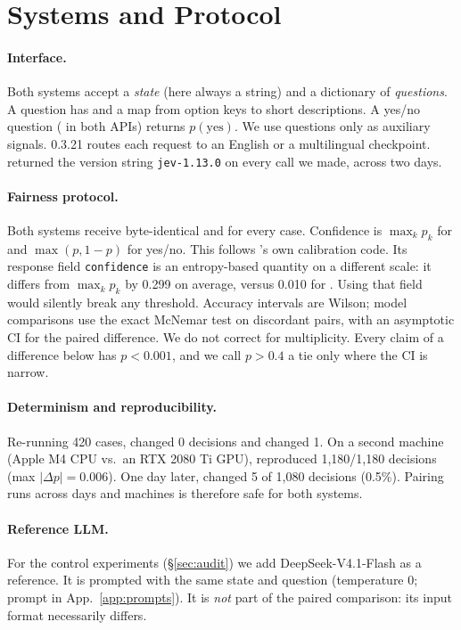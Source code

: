 \section{Systems and Protocol}\label{sec:setup}
\paragraph{Interface.}
Both systems accept a \emph{state} (here always a string) and a dictionary of \emph{questions}. A  question has  and a  map from option keys to short descriptions. A yes/no question ( in both APIs) returns $p(\text{yes})$. We use  questions only as auxiliary signals. \laya{} 0.3.21 routes each request to an English or a multilingual checkpoint. \jev{} returned the version string \texttt{jev-1.13.0} on every call we made, across two days.

\paragraph{Fairness protocol.}
Both systems receive byte-identical  and  for every case. Confidence is $\max_k p_k$ for  and $\max(p,1-p)$ for yes/no. This follows \laya{}'s own calibration code. Its response field \texttt{confidence} is an entropy-based quantity on a different scale: it differs from $\max_k p_k$ by 0.299 on average, versus 0.010 for \jev{}. Using that field would silently break any threshold. Accuracy intervals are Wilson; model comparisons use the exact McNemar test on discordant pairs, with an asymptotic CI for the paired difference. We do not correct for multiplicity. Every claim of a difference below has $p<0.001$, and we call $p>0.4$ a tie only where the CI is narrow.

\paragraph{Determinism and reproducibility.}
Re-running 420 cases, \laya{} changed 0 decisions and \jev{} changed 1. On a second machine (Apple M4 CPU vs.\ an RTX 2080 Ti GPU), \laya{} reproduced 1,180/1,180 decisions (max $|\Delta p|=0.006$). One day later, \jev{} changed 5 of 1,080 decisions (0.5\%). Pairing runs across days and machines is therefore safe for both systems.

\paragraph{Reference LLM.}
For the control experiments (\S\ref{sec:audit}) we add DeepSeek-V4.1-Flash \citep{deepseek2026flash} as a reference. It is prompted with the same state and question (temperature 0; prompt in App.~\ref{app:prompts}). It is \emph{not} part of the paired comparison: its input format necessarily differs.

